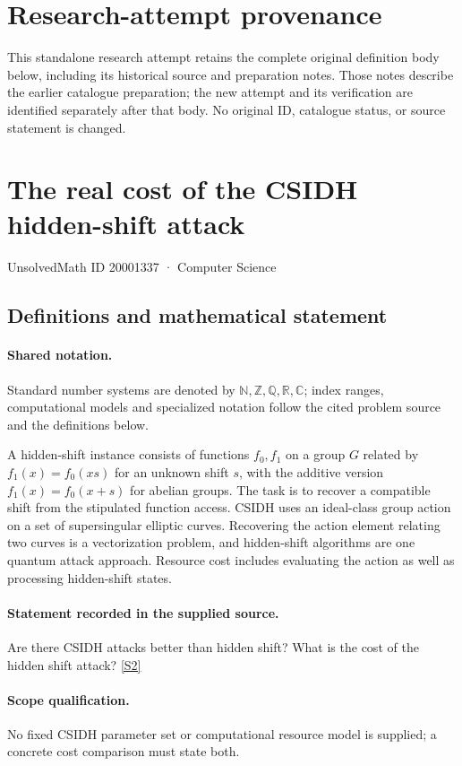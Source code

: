 \documentclass[11pt]{article}
\begin{document}
\section*{Research-attempt provenance}
This standalone research attempt retains the complete original definition body below,
including its historical source and preparation notes. Those notes describe the
earlier catalogue preparation; the new attempt and its verification are identified
separately after that body. No original ID, catalogue status, or source statement is changed.

\section{The real cost of the CSIDH hidden-shift attack}\label{20001337}
{\small UnsolvedMath ID 20001337 · Computer Science}
\subsection{Definitions and mathematical statement}

\paragraph{Shared notation.}Standard number systems are denoted by $\mathbb N,\mathbb Z,\mathbb Q,\mathbb R,\mathbb C$; index ranges, computational models and specialized notation follow the cited problem source and the definitions below.


A hidden-shift instance consists of functions $f_0,f_1$ on a group $G$ related by $f_1(x)=f_0(xs)$ for an unknown shift $s$, with the additive version $f_1(x)=f_0(x+s)$ for abelian groups. The task is to recover a compatible shift from the stipulated function access. CSIDH uses an ideal-class group action on a set of supersingular elliptic curves. Recovering the action element relating two curves is a vectorization problem, and hidden-shift algorithms are one quantum attack approach. Resource cost includes evaluating the action as well as processing hidden-shift states.
\paragraph{Statement recorded in the supplied source.}
Are there CSIDH attacks better than hidden shift? What is the cost of the hidden shift attack? \href{http://aimpl.org/quantumalg/5/}{[S2]}
\paragraph{Scope qualification.}
No fixed CSIDH parameter set or computational resource model is supplied; a concrete cost comparison must state both.
\end{document}
